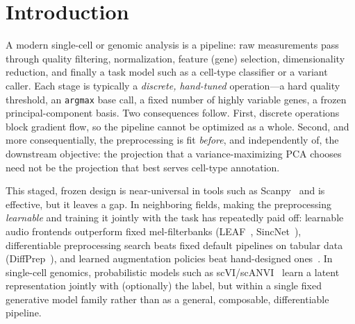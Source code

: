 \documentclass[10pt,twocolumn]{article}
\begin{document}
\section{Introduction}

A modern single-cell or genomic analysis is a pipeline: raw measurements pass through
quality filtering, normalization, feature (gene) selection, dimensionality reduction, and
finally a task model such as a cell-type classifier or a variant caller. Each stage is
typically a \emph{discrete, hand-tuned} operation---a hard quality threshold, an
\texttt{argmax} base call, a fixed number of highly variable genes, a frozen
principal-component basis. Two consequences follow. First, discrete operations block
gradient flow, so the pipeline cannot be optimized as a whole. Second, and more
consequentially, the preprocessing is fit \emph{before}, and independently of, the
downstream objective: the projection that a variance-maximizing PCA chooses need not be
the projection that best serves cell-type annotation.

This staged, frozen design is near-universal in tools such as
Scanpy~\citep{wolf2018scanpy} and is effective, but it leaves a gap. In neighboring
fields, making the preprocessing \emph{learnable} and training it jointly with the task
has repeatedly paid off: learnable audio frontends outperform fixed mel-filterbanks
(LEAF~\citep{zeghidour2021leaf}, SincNet~\citep{ravanelli2018sincnet}), differentiable
preprocessing search beats fixed default pipelines on tabular data
(DiffPrep~\citep{li2023diffprep}), and learned augmentation policies beat hand-designed
ones~\citep{cubuk2019autoaugment}. In single-cell genomics, probabilistic models such as
scVI/scANVI~\citep{lopez2018scvi,xu2021scanvi} learn a latent representation jointly with
(optionally) the label, but within a single fixed generative model family rather than as
a general, composable, differentiable pipeline.
\end{document}
